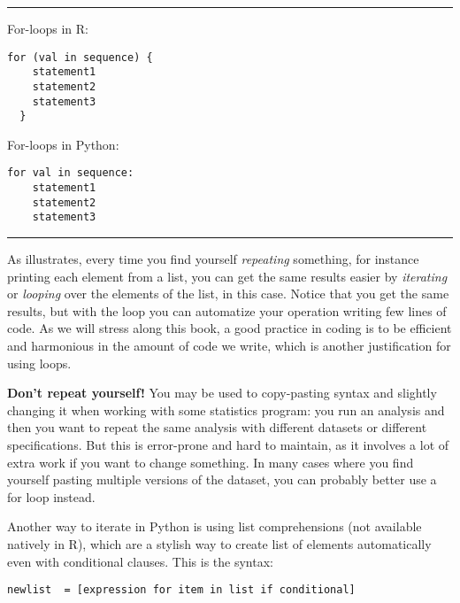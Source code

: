 \noindent\rule{\textwidth}{.5pt}\vspace{-1em}

\noindent\begin{minipage}[t]{.45\textwidth}
  For-loops in R:
\begin{verbatim}
for (val in sequence) {
    statement1
    statement2
    statement3
  }
\end{verbatim}
\end{minipage}
\begin{minipage}[t]{.45\textwidth}
  For-loops in Python:
\begin{verbatim}
for val in sequence:
    statement1
    statement2
    statement3
\end{verbatim}
\end{minipage}
\vspace{.5em}

\noindent\rule{\textwidth}{.5pt}


As  illustrates, every time you find yourself
\emph{repeating} something, for instance printing each element from a
list, you can get the same results easier by \emph{iterating} or
\emph{looping} over the elements of the list, in this case.  Notice
that you get the same results, but with the loop you can automatize your
operation writing few lines of code. As we will stress along this
book, a good practice in coding is to be efficient and harmonious in
the amount of code we write, which is another justification for using
loops.

\begin{feature}
  \textbf{Don't repeat yourself!}
  You may be used to copy-pasting
  syntax and slightly changing it when working with some statistics
  program: you run an analysis and then you want to repeat the same
  analysis with different datasets or different specifications. But
  this is error-prone and hard to maintain, as it involves a lot of
  extra work if you want to change something. In many cases where you
  find yourself pasting multiple versions of the dataset, you can
  probably better use a for loop instead.
  \end{feature}


Another way to iterate in Python is using list comprehensions  (not available natively in R), which are a stylish way to create list of elements automatically even with conditional clauses. This is the syntax:

\begin{verbatim}
newlist  = [expression for item in list if conditional]
\end{verbatim}

